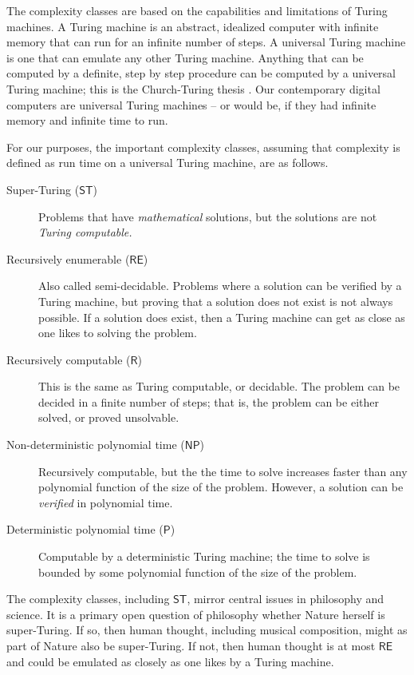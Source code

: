\documentclass[11pt]{scrartcl}
\begin{document}
 The complexity classes are based on the capabilities and limitations of Turing machines. A Turing machine is an abstract, idealized computer with infinite memory that can run for an infinite number of steps. A universal Turing machine is one that can emulate any other Turing machine. Anything that can be computed by a definite, step by step procedure can be computed by a universal Turing machine; this is the Church-Turing thesis \parencite{sep-church-turing}. Our contemporary digital computers are universal Turing machines -- or would be, if they had infinite memory and infinite time to run.
 
 For our purposes, the important complexity classes, assuming that complexity is defined as run time on a universal Turing machine, are as follows.

\begin{description}
\item[Super-Turing ($\mathsf{ST}$)] Problems that have \emph{mathematical} solutions, but the solutions are not \emph{Turing computable.} 
\item[Recursively enumerable ($\mathsf{RE}$)] Also called semi-decidable. Problems where a solution can be verified by a Turing machine, but proving that a solution does not exist is not always possible. If a solution does exist, then a Turing machine can get as close as one likes to solving the problem.
\item[Recursively computable ($\mathsf{R}$)] This is the same as Turing computable, or decidable. The problem can be decided in a finite number of steps; that is, the problem can be either solved, or proved unsolvable.
\item[Non-deterministic polynomial time ($\mathsf{NP}$)] Recursively computable, but the the time to solve increases faster than any polynomial function of the size of the problem. However, a solution can be \emph{verified} in polynomial time.
\item[Deterministic polynomial  time ($\mathsf{P}$)] Computable by a deterministic Turing machine; the time to solve is bounded by some polynomial function of the size of the problem.
\end{description}

The complexity classes, including $\mathsf{ST}$, mirror central issues in philosophy and science. It is a primary open question of philosophy whether Nature herself is super-Turing. If so, then human thought, including musical composition, might as part of Nature also be super-Turing. If not, then human thought is at most $\mathsf{RE}$ and could be emulated as closely as one likes by a Turing machine. 
\end{document}
